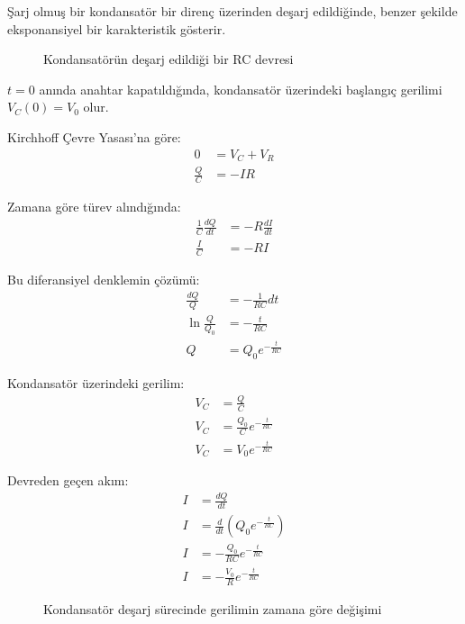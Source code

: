 \documentclass[11pt,letterpaper,twocolumn]{fenbil}
\begin{document}
Şarj olmuş bir kondansatör bir direnç üzerinden deşarj edildiğinde, benzer şekilde eksponansiyel bir karakteristik gösterir.

\begin{figure}[h]
\centering
{}
\caption{Kondansatörün deşarj edildiği bir RC devresi}
\end{figure}

$t = 0$ anında anahtar kapatıldığında, kondansatör üzerindeki başlangıç gerilimi $V_C(0) = V_0$ olur.

Kirchhoff Çevre Yasası'na göre:
\begin{align}
0 &= V_C + V_R\\
\frac{Q}{C} &= -IR
\end{align}

Zamana göre türev alındığında:
\begin{align}
\frac{1}{C}\frac{dQ}{dt} &= -R\frac{dI}{dt}\\
\frac{I}{C} &= -RI
\end{align}

Bu diferansiyel denklemin çözümü:
\begin{align}
\frac{dQ}{Q} &= -\frac{1}{RC}dt\\
\ln\frac{Q}{Q_0} &= -\frac{t}{RC}\\
Q &= Q_0 e^{-\frac{t}{RC}}
\end{align}

Kondansatör üzerindeki gerilim:
\begin{align}
V_C &= \frac{Q}{C}\\
V_C &= \frac{Q_0}{C}e^{-\frac{t}{RC}}\\
V_C &= V_0 e^{-\frac{t}{RC}}
\end{align}

Devreden geçen akım:
\begin{align}
I &= \frac{dQ}{dt}\\
I &= \frac{d}{dt}(Q_0 e^{-\frac{t}{RC}})\\
I &= -\frac{Q_0}{RC}e^{-\frac{t}{RC}}\\
I &= -\frac{V_0}{R}e^{-\frac{t}{RC}}
\end{align}

\begin{figure}[h]
\centering
{}
\caption{Kondansatör deşarj sürecinde gerilimin zamana göre değişimi}
\end{figure}
\end{document}
